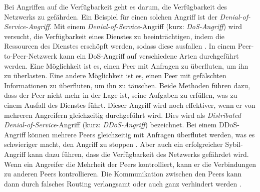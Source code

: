 Bei Angriffen auf die Verfügbarkeit geht es darum, die Verfügbarkeit des Netzwerks zu gefährden. Ein Beispiel für einen solchen Angriff ist der \textit{Denial-of-Service-Angriff}. Mit einem \textit{Denial-of-Service}-Angriff (kurz: \textit{DoS-Angriff}) wird versucht, die Verfügbarkeit eines Dienstes zu beeinträchtigen, indem die Ressourcen des Dienstes erschöpft werden, sodass diese ausfallen \parencite{Bicakci_DoSAttacks}. In einem Peer-to-Peer-Netzwerk kann ein DoS-Angriff auf verschiedene Arten durchgeführt werden. Eine Möglichkeit ist es, einen Peer mit Anfragen zu überfluten, um ihn zu überlasten. Eine andere Möglichkeit ist es, einen Peer mit gefälschten Informationen zu überfluten, um ihn zu täuschen. Beide Methoden führen dazu, dass der Peer nicht mehr in der Lage ist, seine Aufgaben zu erfüllen, was zu einem Ausfall des Dienstes führt. Dieser Angriff wird noch effektiver, wenn er von mehreren Angreifern gleichzeitig durchgeführt wird. Dies wird als \textit{Distributed Denial-of-Service}-Angriff (kurz: \textit{DDoS-Angriff}) bezeichnet. Bei einem DDoS-Angriff können mehrere Peers gleichzeitig mit Anfragen überflutet werden, was es schwieriger macht, den Angriff zu stoppen \Parencite[S. 6]{Baptiste_AttacksOnP2PNetworks}. Aber auch ein erfolgreicher Sybil-Angriff kann dazu führen, dass die Verfügbarkeit des Netzwerks gefährdet wird. Wenn ein Angreifer die Mehrheit der Peers kontrolliert, kann er die Verbindungen zu anderen Peers kontrollieren. Die Kommunikation zwischen den Peers kann dann durch falsches Routing verlangsamt oder auch ganz verhindert werden \parencite[S. 13]{Baptiste_AttacksOnP2PNetworks}.




